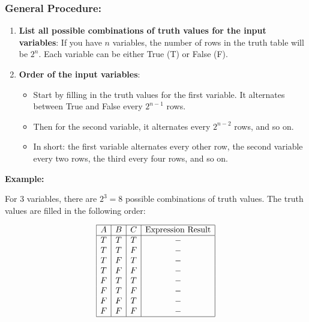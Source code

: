 \subsubsection{General Procedure:}

\begin{enumerate}

	\item \textbf{List all possible combinations of truth values for the input variables}: 
			If you have \(n\) variables, the number of rows in the truth table will be \(2^n\). Each 
			variable can be either True (T) or False (F).

	\item \textbf{Order of the input variables}:

			\begin{itemize}
					
				\item Start by filling in the truth values for the first variable. It alternates between 
					  True and False every \(2^{n-1}\) rows.
					
				\item Then for the second variable, it alternates every \(2^{n-2}\) rows, and so on.
					
				\item In short: the first variable alternates every other row, the second variable every two 
					rows, the third every four rows, and so on.
			
			\end{itemize}

\end{enumerate}

\textbf{Example: } 

For 3 variables, there are \(2^3 = 8\) possible combinations of truth values. The truth values are filled 
in the following order:

\[
	\begin{array}{|c|c|c|c|}
		\hline
		A & B & C & \text{Expression Result} \\
		\hline
		T & T & T &       -                  \\
		T & T & F &       -                  \\
		T & F & T &       -                  \\
		T & F & F &       -                  \\
		F & T & T &       -                  \\
		F & T & F &       -                  \\
		F & F & T &       -                  \\
		F & F & F &       -                  \\
		\hline
	\end{array}
\]

